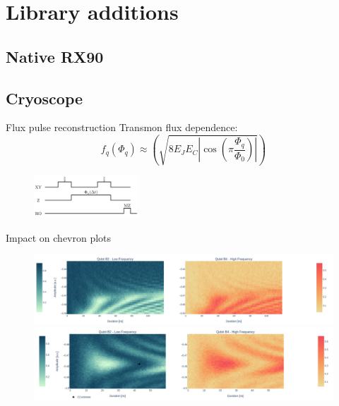 \documentclass[aspectratio=169,10pt]{beamer}
\begin{document}
%  

\section{Library additions}

\subsection{Native RX90}

%  

\subsection{Cryoscope}

\begin{frame}{Flux pulse reconstruction}
  Transmon flux dependence:
  \begin{equation*}
    f_q(\Phi_q) \approx \left( \sqrt{8E_J E_C \left| \cos\left(\pi \frac{\Phi_q}{\Phi_0}\right) \right|} \right)
  \end{equation*}

  \begin{figure}
    \includegraphics[width=0.35\textwidth]{figures/cryoscope_pulse.png}
  \end{figure}
\end{frame}

\begin{frame}{Impact on chevron plots}
  \begin{figure}
    \centering
    \includegraphics[width=\textwidth]{figures/B2B4_nofilter.png}
    \vfill
    \includegraphics[width=\textwidth]{figures/B2B4.png}
  \end{figure}
\end{frame}
\end{document}
